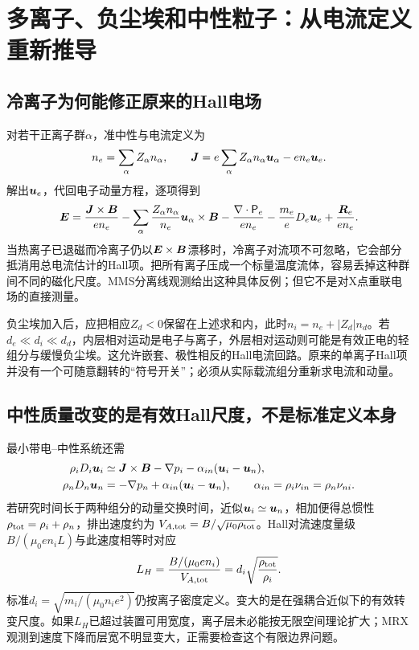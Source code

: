 \section{多离子、负尘埃和中性粒子：从电流定义重新推导}
\label{sec:remaining-multispecies}
\subsection{冷离子为何能修正原来的Hall电场}
对若干正离子群$\alpha$，准中性与电流定义为
\begin{equation}
 n_e=\sum_\alpha Z_\alpha n_\alpha,\qquad
 \bm{J}=e\sum_\alpha Z_\alpha n_\alpha\bm{u}_\alpha-en_e\bm{u}_e.
\end{equation}
解出$\bm{u}_e$，代回电子动量方程，逐项得到
\begin{equation}
 \bm{E}={\bm{J}\times\bm{B}\over en_e}
 -\sum_\alpha{Z_\alpha n_\alpha\over n_e}\bm{u}_\alpha\times\bm{B}
 -{\nabla\cdot\mathsf P_e\over en_e}-{m_e\over e}D_e\bm{u}_e
 +{\bm{R}_e\over en_e}.
\end{equation}
当热离子已退磁而冷离子仍以$\bm{E}\times\bm{B}$漂移时，冷离子对流项不可忽略，它会部分抵消用总电流估计的Hall项。把所有离子压成一个标量温度流体，容易丢掉这种群间不同的磁化尺度。MMS分离线观测给出这种具体反例\citep{L227}；但它不是对X点重联电场的直接测量。

负尘埃加入后，应把相应$Z_d<0$保留在上述求和内，此时$n_i=n_e+|Z_d|n_d$。若$d_e\ll d_i\ll d_d$，内层相对运动是电子与离子，外层相对运动则可能是有效正电的轻组分与缓慢负尘埃。这允许嵌套、极性相反的Hall电流回路\citep{L283}。原来的单离子Hall项并没有一个可随意翻转的“符号开关”；必须从实际载流组分重新求电流和动量。

\subsection{中性质量改变的是有效Hall尺度，不是标准定义本身}
最小带电--中性系统还需
\begin{align}
 \rho_iD_i\bm{u}_i&\simeq\bm{J}\times\bm{B}-\nabla p_i-\alpha_{in}(\bm{u}_i-\bm{u}_n),\\
 \rho_nD_n\bm{u}_n&=-\nabla p_n+\alpha_{in}(\bm{u}_i-\bm{u}_n),
 \qquad\alpha_{in}=\rho_i\nu_{in}=\rho_n\nu_{ni}.
\end{align}
若研究时间长于两种组分的动量交换时间，近似$\bm{u}_i\simeq\bm{u}_n$，相加便得总惯性$\rho_{\rm tot}=\rho_i+\rho_n$，排出速度约为
$V_{A,\rm tot}=B/\sqrt{\mu_0\rho_{\rm tot}}$。Hall对流速度量级$B/(\mu_0en_iL)$与此速度相等时对应
\begin{equation}
 L_H={B/(\mu_0en_i)\over V_{A,\rm tot}}
 =d_i\sqrt{\rho_{\rm tot}\over\rho_i}.
\end{equation}
标准$d_i=\sqrt{m_i/(\mu_0n_ie^2)}$仍按离子密度定义。变大的是在强耦合近似下的有效转变尺度。如果$L_H$已超过装置可用宽度，离子层未必能按无限空间理论扩大；MRX观测到速度下降而层宽不明显变大，正需要检查这个有限边界问题\citep{L190}。

